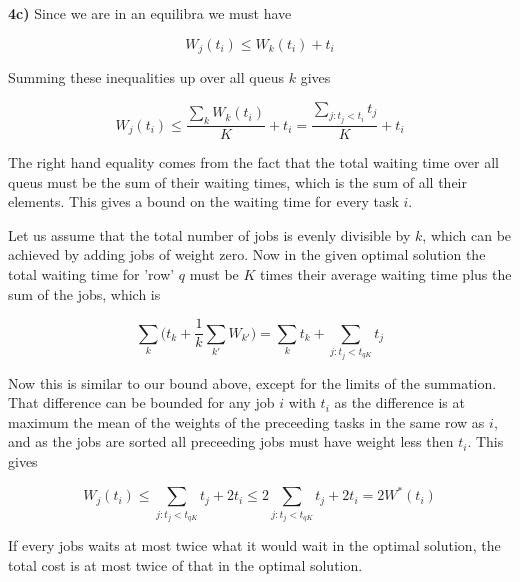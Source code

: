 \textbf{4c)} Since we are in an equilibra we must have

$$
W_j(t_i) \le W_k(t_i) + t_i
$$

Summing these inequalities up over all queus $k$ gives

$$
W_j(t_i) \le \frac{\sum_k W_k(t_i)}{K} + t_i = \frac{\sum_{j: t_j < t_i}  t_j}{K} + t_i 
$$

The right hand equality comes from the fact that the total waiting time over all queus must be the sum of their waiting times, which is the sum of all their elements. This gives a bound on the waiting time for every task $i$. 

Let us assume that the total number of jobs is evenly divisible by $k$, which can be achieved by adding jobs of weight zero. Now in the given optimal solution the total waiting time for 'row' $q$ must be $K$ times their average waiting time plus the sum of the jobs, which is

$$
\sum_k \bigg( t_k + \frac{1}{k} \sum_{k'} W_{k'} \bigg) = \sum_k t_k +  \sum_{j: t_j < t_{qK}}  t_j 
$$

Now this is similar to our bound above, except for the limits of the summation. That difference can be bounded for any job $i$ with $t_i$ as the difference is at maximum the mean of the weights of the preceeding tasks in the same row as $i$, and as the jobs are sorted all preceeding jobs must have weight less then $t_i$. This gives 

$$
W_j(t_i) \le \sum_{j: t_j < t_{qK}}  t_j  + 2 t_i \le 2 \sum_{j: t_j < t_{qK}}  t_j  + 2 t_i = 2 W^*(t_i)
$$

If every jobs waits at most twice what it would wait in the optimal solution, the total cost is at most twice of that in the optimal solution.

